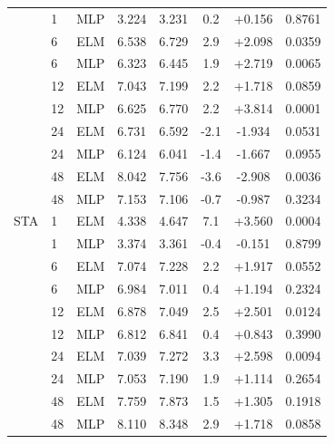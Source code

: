 \begin{table}[H]
{\begin{tabular}{llcccccc}
 & 1 & MLP & 3.224 & 3.231 & 0.2 & +0.156 & 0.8761 \\
 & 6 & ELM & 6.538 & 6.729 & 2.9 & +2.098 & 0.0359 \\
 & 6 & MLP & 6.323 & 6.445 & 1.9 & +2.719 & 0.0065 \\
 & 12 & ELM & 7.043 & 7.199 & 2.2 & +1.718 & 0.0859 \\
 & 12 & MLP & 6.625 & 6.770 & 2.2 & +3.814 & 0.0001 \\
 & 24 & ELM & 6.731 & 6.592 & -2.1 & -1.934 & 0.0531 \\
 & 24 & MLP & 6.124 & 6.041 & -1.4 & -1.667 & 0.0955 \\
 & 48 & ELM & 8.042 & 7.756 & -3.6 & -2.908 & 0.0036 \\
 & 48 & MLP & 7.153 & 7.106 & -0.7 & -0.987 & 0.3234 \\
\midrule
STA & 1 & ELM & 4.338 & 4.647 & 7.1 & +3.560 & 0.0004 \\
 & 1 & MLP & 3.374 & 3.361 & -0.4 & -0.151 & 0.8799 \\
 & 6 & ELM & 7.074 & 7.228 & 2.2 & +1.917 & 0.0552 \\
 & 6 & MLP & 6.984 & 7.011 & 0.4 & +1.194 & 0.2324 \\
 & 12 & ELM & 6.878 & 7.049 & 2.5 & +2.501 & 0.0124 \\
 & 12 & MLP & 6.812 & 6.841 & 0.4 & +0.843 & 0.3990 \\
 & 24 & ELM & 7.039 & 7.272 & 3.3 & +2.598 & 0.0094 \\
 & 24 & MLP & 7.053 & 7.190 & 1.9 & +1.114 & 0.2654 \\
 & 48 & ELM & 7.759 & 7.873 & 1.5 & +1.305 & 0.1918 \\
 & 48 & MLP & 8.110 & 8.348 & 2.9 & +1.718 & 0.0858 \\
\bottomrule
\end{tabular}}
\end{table}
